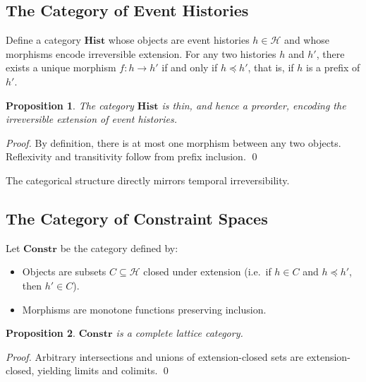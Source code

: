 \documentclass[11pt]{article}
\newtheorem{proposition}{Proposition}
\newcommand{\Hist}{\mathcal{H}}
\begin{document}
\subsection{The Category of Event Histories}

Define a category $\mathbf{Hist}$ whose objects are event histories
$h \in \Hist$ and whose morphisms encode irreversible extension. For any two
histories $h$ and $h'$, there exists a unique morphism $f : h \to h'$ if and only
if $h \preceq h'$, that is, if $h$ is a prefix of $h'$.

\begin{proposition}
The category $\mathbf{Hist}$ is thin, and hence a preorder, encoding the
irreversible extension of event histories.
\end{proposition}


\begin{proof}
By definition, there is at most one morphism between any two objects. Reflexivity
and transitivity follow from prefix inclusion. \qed
\end{proof}

The categorical structure directly mirrors temporal irreversibility.

\subsection{The Category of Constraint Spaces}

Let $\mathbf{Constr}$ be the category defined by:

\begin{itemize}
\item Objects are subsets $C \subseteq \Hist$ closed under extension
(i.e.\ if $h \in C$ and $h \preceq h'$, then $h' \in C$).
\item Morphisms are monotone functions preserving inclusion.
\end{itemize}

\begin{proposition}
$\mathbf{Constr}$ is a complete lattice category.
\end{proposition}

\begin{proof}
Arbitrary intersections and unions of extension-closed sets are extension-closed,
yielding limits and colimits. \qed
\end{proof}
\end{document}
